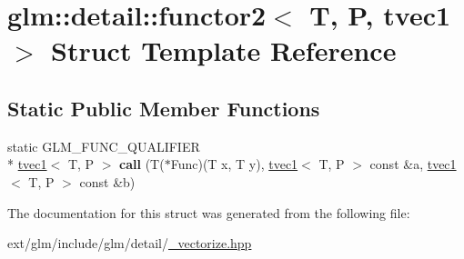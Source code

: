 \hypertarget{structglm_1_1detail_1_1functor2_3_01_t_00_01_p_00_01tvec1_01_4}{\section{glm\-:\-:detail\-:\-:functor2$<$ T, P, tvec1 $>$ Struct Template Reference}
\label{structglm_1_1detail_1_1functor2_3_01_t_00_01_p_00_01tvec1_01_4}
}
\subsection*{Static Public Member Functions}
\begin{DoxyCompactItemize}
\item 
\hypertarget{structglm_1_1detail_1_1functor2_3_01_t_00_01_p_00_01tvec1_01_4_a7f805874487ee439ec9f5ca600f1813d}{static G\-L\-M\-\_\-\-F\-U\-N\-C\-\_\-\-Q\-U\-A\-L\-I\-F\-I\-E\-R \\*
\hyperlink{structglm_1_1tvec1}{tvec1}$<$ T, P $>$ {\bfseries call} (T($\ast$Func)(T x, T y), \hyperlink{structglm_1_1tvec1}{tvec1}$<$ T, P $>$ const \&a, \hyperlink{structglm_1_1tvec1}{tvec1}$<$ T, P $>$ const \&b)}\label{structglm_1_1detail_1_1functor2_3_01_t_00_01_p_00_01tvec1_01_4_a7f805874487ee439ec9f5ca600f1813d}

\end{DoxyCompactItemize}


The documentation for this struct was generated from the following file\-:\begin{DoxyCompactItemize}
\item 
ext/glm/include/glm/detail/\hyperlink{__vectorize_8hpp}{\-\_\-vectorize.\-hpp}\end{DoxyCompactItemize}
